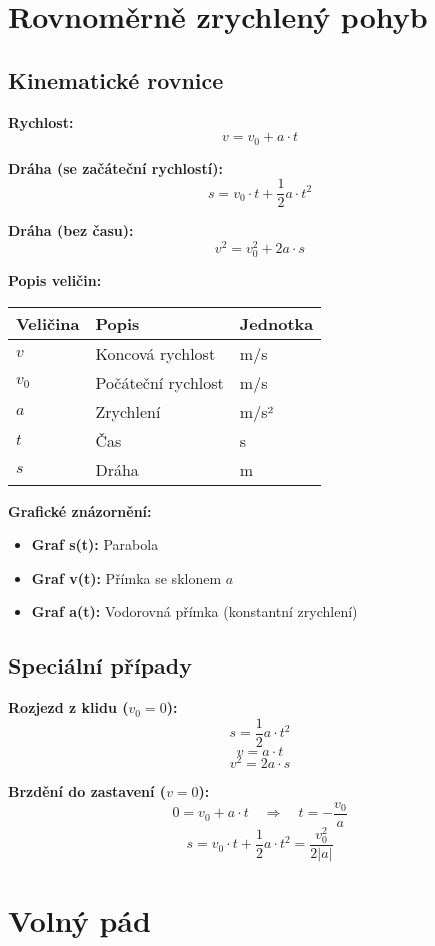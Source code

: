 \documentclass[11pt,a4paper]{article}
\begin{document}
\clearpage

\section{Rovnoměrně zrychlený pohyb}

\subsection{Kinematické rovnice}

\textbf{Rychlost:}
\[v = v_0 + a \cdot t\]

\textbf{Dráha (se začáteční rychlostí):}
\[s = v_0 \cdot t + \frac{1}{2} a \cdot t^2\]

\textbf{Dráha (bez času):}
\[v^2 = v_0^2 + 2 a \cdot s\]

\textbf{Popis veličin:}

\begin{longtable}{lll}
\toprule
Veličina & Popis & Jednotka \\
\midrule
$v$ & Koncová rychlost & m/s \\
$v_0$ & Počáteční rychlost & m/s \\
$a$ & Zrychlení & m/s² \\
$t$ & Čas & s \\
$s$ & Dráha & m \\
\bottomrule
\end{longtable}

\textbf{Grafické znázornění:}
\begin{itemize}
\item \textbf{Graf s(t):} Parabola
\item \textbf{Graf v(t):} Přímka se sklonem $a$
\item \textbf{Graf a(t):} Vodorovná přímka (konstantní zrychlení)
\end{itemize}

\subsection{Speciální případy}

\textbf{Rozjezd z klidu ($v_0 = 0$):}
\[s = \frac{1}{2} a \cdot t^2\]
\[v = a \cdot t\]
\[v^2 = 2 a \cdot s\]

\textbf{Brzdění do zastavení ($v = 0$):}
\[0 = v_0 + a \cdot t \quad \Rightarrow \quad t = -\frac{v_0}{a}\]
\[s = v_0 \cdot t + \frac{1}{2} a \cdot t^2 = \frac{v_0^2}{2|a|}\]

\clearpage

\section{Volný pád}
\end{document}
